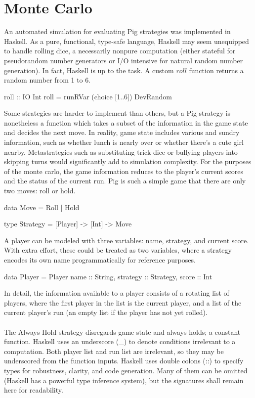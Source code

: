 \documentclass{article}
\begin{document}
\section*{Monte Carlo}
An automated simulation for evaluating Pig strategies was implemented in Haskell. As a pure, functional, type-safe language, Haskell may seem unequipped to handle rolling dice, a necessarily nonpure computation (either stateful for pseudorandom number generators or I/O intensive for natural random number generation). In fact, Haskell is up to the task. A custom $roll$ function returns a random number from 1 to 6.
\begin{verbatimtab}
roll :: IO Int
roll = runRVar (choice [1..6]) DevRandom
\end{verbatimtab}
Some strategies are harder to implement than others, but a Pig strategy is nonetheless a function which takes a subset of the information in the game state and decides the next move. In reality, game state includes various and sundry information, such as whether lunch is nearly over or whether there's a cute girl nearby. Metastrategies such as substituting trick dice or bullying players into skipping turns would significantly add to simulation complexity. For the purposes of the monte carlo, the game information reduces to the player's current scores and the status of the current run. Pig is such a simple game that there are only two moves: roll or hold.
\begin{verbatimtab}
data Move = Roll | Hold

type Strategy = [Player] -> [Int] -> Move
\end{verbatimtab}
A player can be modeled with three variables: name, strategy, and current score. With extra effort, these could be treated as two variables, where a strategy encodes its own name programmatically for reference purposes.
\begin{verbatimtab}
data Player = Player {
  name :: String,
  strategy :: Strategy,
  score :: Int
  }
\end{verbatimtab}
In detail, the information available to a player consists of a rotating list of players, where the first player in the list is the current player, and a list of the current player's run (an empty list if the player has not yet rolled).
\\\\
The Always Hold strategy disregards game state and always holds; a constant function. Haskell uses an underscore (\_) to denote conditions irrelevant to a computation. Both player list and run list are irrelevant, so they may be underscored from the function inputs. Haskell uses double colons (::) to specify types for robustness, clarity, and code generation. Many of them can be omitted (Haskell has a powerful type inference system), but the signatures shall remain here for readability.
\end{document}

